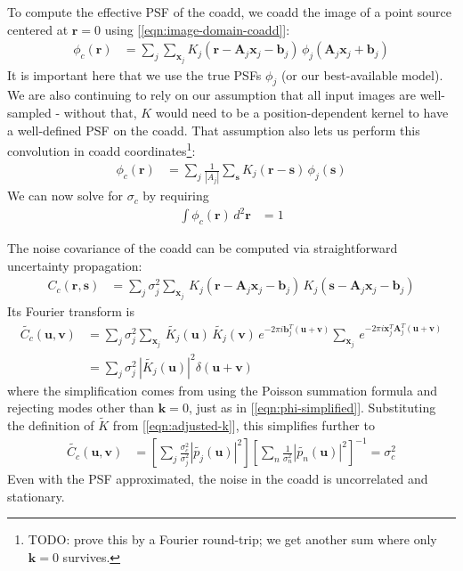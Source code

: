 \documentclass[DM,authoryear,toc]{lsstdoc}
\begin{document}
To compute the effective PSF of the coadd, we coadd the image of a point source centered at $\symbf{r}=0$ using [\ref{eqn:image-domain-coadd}]:
\begin{align}
    \phi_c(\symbf{r}) &= \sum_j \sum_{\symbf{x}_j} K_j\!\left(\symbf{r} - \symbf{A}_j\symbf{x}_j - \symbf{b}_j\right) \, \phi_j\!\left(\symbf{A}_j\symbf{x}_j + \symbf{b}_j\right)
\end{align}
It is important here that we use the true PSFs $\phi_j$ (or our best-available model).
We are also continuing to rely on our assumption that all input images are well-sampled - without that, $K$ would need to be a position-dependent kernel to have a well-defined PSF on the coadd.
That assumption also lets us perform this convolution in coadd coordinates\footnote{TODO: prove this by a Fourier round-trip; we get another sum where only $\symbf{k}=0$ survives.}:
\begin{align}
    \phi_c(\symbf{r}) &= \sum_j \frac{1}{|A_j|} \sum_{\symbf{s}} K_j\!\left(\symbf{r} - \symbf{s}\right) \, \phi_j\!\left(\symbf{s}\right)
\end{align}
We can now solve for $\sigma_c$ by requiring
\begin{align}
    \int\! \phi_c(\symbf{r}) \, d^2 \symbf{r} &= 1
\end{align}

The noise covariance of the coadd can be computed via straightforward uncertainty propagation:
\begin{align}
    C_c(\symbf{r}, \symbf{s}) &= \sum_j \sigma_j^2 \sum_{\symbf{x}_j} \,
        K_j\!\left(\symbf{r} - \symbf{A}_j\symbf{x}_j - \symbf{b}_j\right) \,
        K_j\!\left(\symbf{s} - \symbf{A}_j\symbf{x}_j - \symbf{b}_j\right)
\end{align}
Its Fourier transform is
\begin{align}
    \widetilde{C_c}(\symbf{u}, \symbf{v}) &= \sum_j \sigma_j^2 \sum_{\symbf{x}_j} \,
        \widetilde{K_j}(\symbf{u}) \, \widetilde{K_j}(\symbf{v}) \,
        e^{-2\pi i \symbf{b}_j^T(\symbf{u} + \symbf{v})}
        \sum_{\symbf{x}_j} \, e^{-2\pi i \symbf{x}_j^{T} \symbf{A}_j^T (\symbf{u} + \symbf{v})} \\
    &= \sum_j \sigma_j^2 \, \left|\widetilde{K_j}(\symbf{u}) \right|^2 \delta(\symbf{u} + \symbf{v})
\end{align}
where the simplification comes from using the Poisson summation formula and rejecting modes other than $\symbf{k}=0$, just as in [\ref{eqn:phi-simplified}].
Substituting the definition of $\widetilde{K}$ from [\ref{eqn:adjusted-k}], this simplifies further to
\begin{align}
    \widetilde{C_c}(\symbf{u}, \symbf{v}) &=
        \left[\sum_j \frac{\sigma_c^2}{\sigma_j^2} \left|\widetilde{p_j}(\symbf{u})\right|^2\right]
        \left[\sum_n \frac{1}{\sigma_n^2} \left|\widetilde{p_n}(\symbf{u})\right|^2\right]^{-1}
        = \sigma_c^2
\end{align}
Even with the PSF approximated, the noise in the coadd is uncorrelated and stationary.
\end{document}
